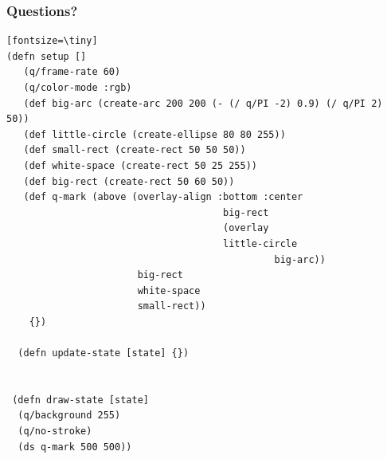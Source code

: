 \documentclass{beamer}
\begin{document}
\begin{frame}[fragile]
\frametitle{Questions?}

\begin{verbatim}[fontsize=\tiny]
(defn setup []
   (q/frame-rate 60)
   (q/color-mode :rgb)
   (def big-arc (create-arc 200 200 (- (/ q/PI -2) 0.9) (/ q/PI 2) 50))
   (def little-circle (create-ellipse 80 80 255))
   (def small-rect (create-rect 50 50 50))
   (def white-space (create-rect 50 25 255))
   (def big-rect (create-rect 50 60 50))
   (def q-mark (above (overlay-align :bottom :center
                                      big-rect
                                      (overlay 
                                      little-circle
                                               big-arc))
                       big-rect
                       white-space
                       small-rect))
    {})
  
  (defn update-state [state] {})


 (defn draw-state [state]
  (q/background 255)
  (q/no-stroke)
  (ds q-mark 500 500))
\end{verbatim}
\end{frame}
\end{document}
